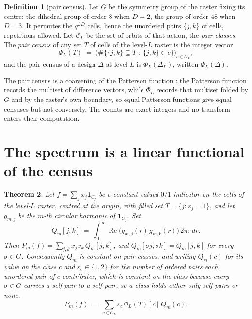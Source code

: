 \documentclass[11pt]{amsart}
\newtheorem{theorem}{Theorem}[section]
\theoremstyle{definition}
\newtheorem{definition}[theorem]{Definition}
\theoremstyle{remark}
\begin{document}
\begin{definition}[pair census]
\label{def:census}
Let $G$ be the symmetry group of the raster fixing its centre: the dihedral group of order $8$ when $D = 2$, the group of order $48$ when $D = 3$. It permutes the $q^{LD}$ cells, hence the unordered pairs $\{j, k\}$ of cells, repetitions allowed. Let $\mathcal C_L$ be the set of orbits of that action, the \emph{pair classes}. The \emph{pair census} of any set $T$ of cells of the level-$L$ raster is the integer vector
\[
\Phi_L(T) \;=\; \bigl( \#\{ \{j,k\} \subseteq T \;:\; \{j,k\} \in c \} \bigr)_{c \in \mathcal C_L} ,
\]
and the pair census of a design $\Delta$ at level $L$ is $\Phi_L(\Delta_L)$, written $\Phi_L(\Delta)$.
\end{definition}

The pair census is a coarsening of the Patterson function \cite{patterson}: the Patterson function records the multiset of difference vectors, while $\Phi_L$ records that multiset folded by $G$ and by the raster's own boundary, so equal Patterson functions give equal censuses but not conversely. The counts are exact integers and no transform enters their computation.

\section{The spectrum is a linear functional of the census}
\label{sec:reduction}

\begin{theorem}
\label{thm:reduction}
Let $f = \sum_j x_j \mathbf 1_{C_j}$ be a constant-valued $0/1$ indicator on the cells of the level-$L$ raster, centred at the origin, with filled set $T = \{ j : x_j = 1\}$, and let $g_{m,j}$ be the $m$-th circular harmonic of $\mathbf 1_{C_j}$. Set
\[
Q_m[j,k] \;=\; \int_0^\infty \operatorname{Re}\bigl( g_{m,j}(r)\, \overline{g_{m,k}(r)} \bigr) \, 2\pi r \, dr .
\]
Then $P_m(f) = \sum_{j,k} x_j x_k\, Q_m[j,k]$, and $Q_m[\sigma j, \sigma k] = Q_m[j,k]$ for every $\sigma \in G$. Consequently $Q_m$ is constant on pair classes, and writing $Q_m(c)$ for its value on the class $c$ and $\varepsilon_c \in \{1,2\}$ for the number of ordered pairs each unordered pair of $c$ contributes, which is constant on the class because every $\sigma \in G$ carries a self-pair to a self-pair, so a class holds either only self-pairs or none,
\[
P_m(f) \;=\; \sum_{c \in \mathcal C_L} \varepsilon_c \, \Phi_L(T)[c] \, Q_m(c) .
\]
\end{theorem}
\end{document}
